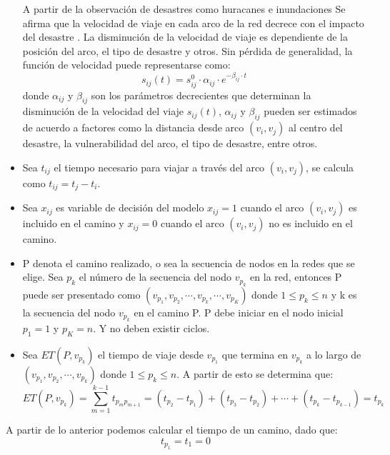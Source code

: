 \begin{itemize}
    A partir de la observación de desastres como huracanes e inundaciones Se afirma que la velocidad de viaje en cada arco de la red decrece con el impacto del desastre \cite{tufekci1995integrated}. La disminución de la velocidad de viaje es dependiente de la posición del arco, el tipo de desastre y otros.  Sin pérdida de generalidad, la función de velocidad puede representarse como:
\begin{equation}
	  s_{ij}(t) = s_{ij}^0 \cdot \alpha_{ij} \cdot e^{-\beta_{ij} \cdot t}
\end{equation}
donde \(\alpha_{ij}\) y \(\beta_{ij}\) son los parámetros decrecientes que determinan la disminución de la velocidad del viaje \(s_{ij}(t)\), \(\alpha_{ij}\) y \(\beta_{ij}\) pueden ser estimados de acuerdo a factores como la distancia desde arco $(v_i,v_j)$ al centro del desastre, la vulnerabilidad del arco, el tipo de desastre, entre otros.
	\item Sea \(t_{ij}\) el tiempo necesario para viajar a través del arco $(v_i,v_j)$, se calcula como $t_{ij}=t_j-t_i$.
	\item Sea $x_{ij}$ es variable de decisión del modelo $x_{ij} = 1 $ cuando el arco $(v_i,v_j)$ es incluido en el camino y $x_{ij} = 0 $ cuando el arco $(v_i,v_j)$ no es incluido en el camino.
	\item P denota el camino realizado, o sea la secuencia de nodos en la redes que se elige. Sea $p_k$ el número de la secuencia del nodo $v_{p_k}$	en la red, entonces P puede ser presentado como $(v_{p_1},v_{p_2},\cdots,v_{p_k},\cdots,v_{p_K})$ donde $1\leq p_k \leq n$ y k es la secuencia del nodo   $v_{p_k}$ en el camino P.  P debe iniciar en el nodo inicial $p_1=1$ y $p_K=n$. Y no deben existir ciclos.
	\item Sea $ET(P,v_{p_k})$ el tiempo de viaje desde $v_{p_1}$ que termina en $v_{p_k}$ a lo largo de $(v_{p_1},v_{p_2},\cdots,v_{p_k})$ donde $1\leq p_k \leq n$. A partir de esto se determina que:
	\begin{equation}
		ET(P,v_{p_k})= \sum_{m=1}^{k-1} t_{p_mp_{m+1}} = (t_{p_2} - t_{p_1}) +(t_{p_3} - t_{p_2}) + \cdots + (t_{p_k} - t_{p_{k-1}}) = t_{p_k}
	\end{equation}
	

\end{itemize}
 A partir de lo anterior podemos calcular el tiempo de un camino, dado que:
\begin{equation}\label{borde}
	  t_{p_1} = t_1 = 0
\end{equation} 
 
